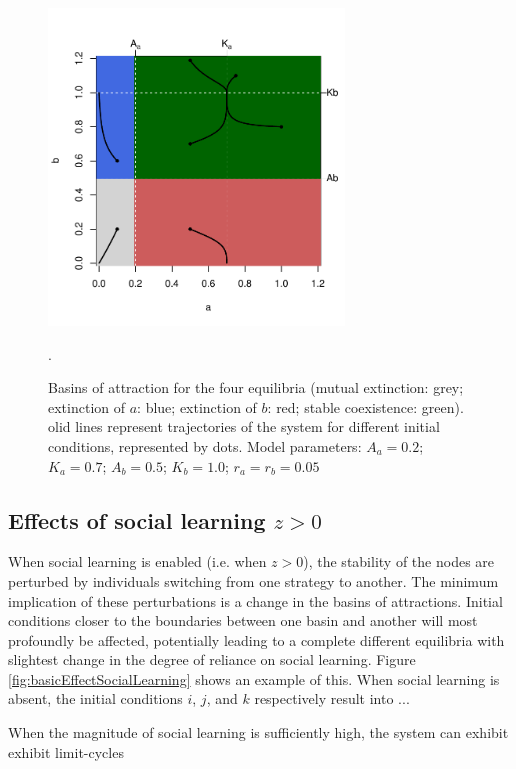 \documentclass[preprint,authoryear]{elsarticle}
\begin{document}
\begin{figure}[h!]
  \centering
      \includegraphics[width=0.7\textwidth]{./figures/figure2.pdf}
  \caption{Basins of attraction for the four equilibria (mutual extinction: grey; extinction of $a$: blue; extinction of $b$: red; stable coexistence: green). olid lines represent trajectories of the system for different initial conditions, represented by dots. Model parameters: $A_a=0.2$; $K_a=0.7$; $A_b=0.5$; $K_b=1.0$; $r_a=r_b=0.05$}.
    \label{fig:NoTransmissionBasin}
\end{figure}

\subsection{Effects of social learning $z>0$}

When social learning is enabled (i.e. when $z>0$), the stability of the nodes are perturbed by individuals switching from one strategy to another. The minimum implication of these perturbations is a change in the basins of attractions. Initial conditions closer to the boundaries between one basin and another will most profoundly be affected, potentially leading to a complete different equilibria with slightest change in the degree of reliance on social learning. Figure \ref{fig:basicEffectSocialLearning} shows an example of this. When social learning is absent, the initial conditions $i$, $j$, and $k$ respectively result into ...


When the magnitude of social learning is sufficiently high, the system can exhibit exhibit limit-cycles 
\end{document}
